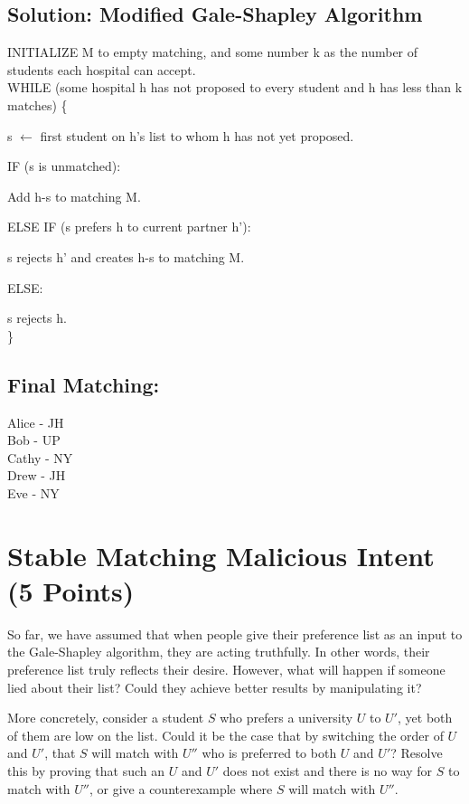 \documentclass[11pt]{article}
\begin{document}
\subsection{Solution: Modified Gale-Shapley Algorithm}

INITIALIZE M to empty matching, and some number k as the number of students each hospital can accept. \\
WHILE (some hospital h has not proposed to every student and h has less than k matches) \{

\indent s $\leftarrow$ first student on h's list to whom h has not yet proposed.

\indent IF (s is unmatched):\@ 

\indent \indent Add h-s to matching M.

\indent ELSE IF (s prefers h to current partner h'):\@

\indent \indent s rejects h' and creates h-s to matching M.

\indent ELSE:\@

\indent \indent s rejects h. \\
\}

\subsection{Final Matching:}
Alice - JH \\
Bob - UP \\
Cathy - NY \\
Drew - JH \\
Eve - NY \\

\section{Stable Matching Malicious Intent (5 Points)}

So far, we have assumed that when people give their preference list as an input to the Gale-Shapley algorithm, they are acting truthfully. In other words, their preference list truly reflects their desire. However, what will happen if someone lied about their list? Could they achieve better results by manipulating it?

More concretely, consider a student $S$ who prefers a university $U$ to $U'$, yet both of them are low on the list. Could it be the case that by switching the order of $U$ and $U'$, that $S$ will match with $U''$ who is preferred to both $U$ and $U'$?  Resolve this by proving that such an $U$ and $U'$ does not exist and there is no way for $S$ to match with $U''$, or give a counterexample where $S$ will match with $U''$.
\end{document}
